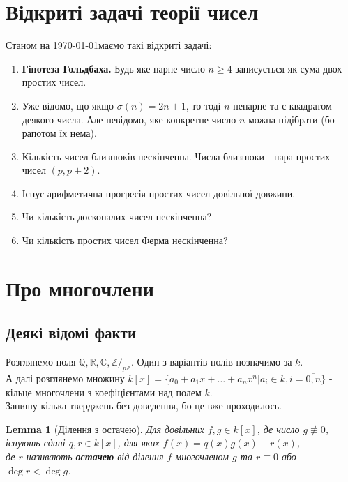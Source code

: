 \documentclass[a4paper, 10pt]{article}
\theoremstyle{theoremdd}
\theoremstyle{theoremdd}
\theoremstyle{theoremdd}
\theoremstyle{theoremdd}
\theoremstyle{theoremdd}
\theoremstyle{theoremdd}
\theoremstyle{theoremdd}
\newtheorem{lemma}[theorem]{Lemma}
\theoremstyle{theoremdd}
\begin{document}
\section*{Відкриті задачі теорії чисел}
Станом на \today маємо такі відкриті задачі:
\begin{enumerate}
\item \textbf{Гіпотеза Гольдбаха.} Будь-яке парне число $n \geq 4$ записується як сума двох простих чисел.
\item Уже відомо, що якщо $\sigma(n) = 2n+1$, то тоді $n$ непарне та є квадратом деякого числа. Але невідомо, яке конкретне число $n$ можна підібрати (бо рапотом їх нема).
\item Кількість чисел-близнюків нескінченна. Числа-близнюки - пара простих чисел $(p,p+2)$.
\item Існує арифметична прогресія простих чисел довільної довжини.
\item Чи кількість досконалих чисел нескінченна?
\item Чи кількість простих чисел Ферма нескінченна?
\end{enumerate}

\iffalse
\newpage
\section*{Про многочлени}
\subsection*{Деякі відомі факти}
Розглянемо поля $\mathbb{Q}, \mathbb{R}, \mathbb{C}, \mathbb{Z} /_{p\mathbb{Z}}$. Один з варіантів полів позначимо за $k$.\\
А далі розглянемо множину $k[x] = \{a_0+a_1x+\dots+a_nx^n | a_i \in k, i = \overline{0,n}\}$ - кільце многочлени з коефіцієнтами над полем $k$.
\bigskip \\
Запишу кілька тверджень без доведення, бо це вже проходилось.

\begin{lemma}[Ділення з остачею]
Для довільних $f,g \in k[x]$, де число $g \not\equiv 0$, існують єдині $q,r \in k[x]$, для яких $f(x) = q(x)g(x) + r(x)$,\\
де $r$ називають \textbf{остачею} від ділення $f$ многочленом $g$ та $r \equiv 0$ або $\deg r < \deg g$.
\end{lemma}
\end{document}
